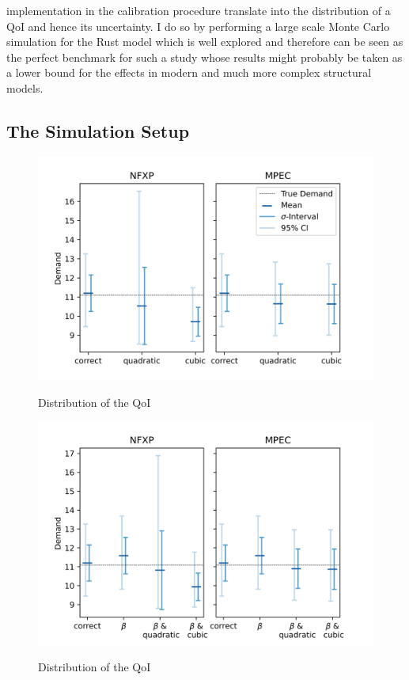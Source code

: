 implementation in the calibration procedure translate into the distribution of a QoI and hence its uncertainty. I do so by performing a large scale Monte Carlo simulation for the Rust model which is well explored and therefore can be seen as the perfect benchmark for such a study whose results might probably be taken as a lower bound for the effects in modern and much more complex structural models.

\subsection{The Simulation Setup}


\begin{figure}[H]
	\caption{Distribution of the QoI}
	\vspace*{-4mm}
	\centering
	\includegraphics[scale=0.9]{../figures/figure_5.png}
	\label{figure5}
\end{figure}


\begin{figure}[H]
	\caption{Distribution of the QoI}
	\vspace*{-4mm}
	\centering
	\includegraphics[scale=0.9]{../figures/figure_6.png}
	\label{figure6}
\end{figure}

